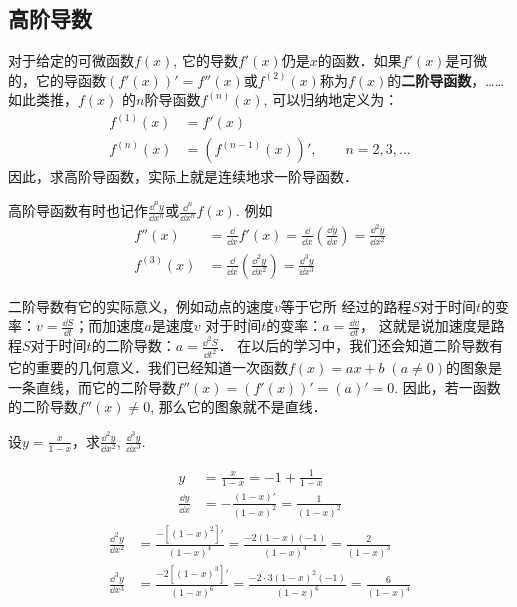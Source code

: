 \subsection{高阶导数}
对于给定的可微函数$f(x)$, 它的导数$f'(x)$仍是$x$的函数．如果$f'(x)$是可微的，它的导函数$(f'(x))'=f''(x)$或$f^{(2)}(x)$称为$f(x)$的\textbf{二阶导函数}，……如此类推，$f(x)$
的$n$阶导函数$f^{(n)}(x)$, 可以归纳地定义为：
\begin{align*}
  f ^{(1)} (x)&=f'(x)\\
  f ^{(n)} (x)&=\left(f^{(n-1)}(x)\right)',\qquad n=2,3,\ldots  
\end{align*}
因此，求高阶导函数，实际上就是连续地求一阶导函数．

高阶导函数有时也记作$\frac{\dd^n y}{\dd x^n}$或$\frac{\dd^n }{\dd x^n}f(x)$. 例如
\begin{align*}
    f''(x)&=\frac{\dd}{\dd x}f'(x)=\frac{\dd}{\dd x}\left(\frac{\dd y}{\dd x}\right)=\frac{\dd^2 y}{\dd x^2}\\
    f^{(3)}(x)&=\frac{\dd}{\dd x}\left(\frac{\dd^2 y}{\dd x^2}\right)=\frac{\dd^3 y}{\dd x^3}
\end{align*}

二阶导数有它的实际意义，例如动点的速度$v$等于它所
经过的路程$S$对于时间$t$的变率：$v=\frac{\dd S}{\dd t}$；而加速度$a$是速度$v$
对于时间$t$的变率：$a=\frac{\dd v}{\dd t}$，
这就是说加速度是路程$S$对于时间$t$的二阶导数：$a=\frac{\dd^2 S}{\dd t^2}$．
在以后的学习中，我们还会知道二阶导数有它的重要的几何意义．我们已经知道一次函数$f(x)=ax+b\; (a\ne 0)$的图象是一条直线，而它的二阶导数$f''(x)=(f'(x))'=(a)'=0$. 因此，若一函数的二阶导数$f''(x)\ne 0$, 那么它的图象就不是直线．

\begin{example}
设$y=\frac{x}{1-x}$，求$\frac{\dd^2 y}{\dd x^2}$, $\frac{\dd^3 y}{\dd x^3}$.
\end{example}

\begin{solution}
\begin{align*}
    y&=\frac{x}{1-x}=-1+\frac{1}{1-x}\\
\frac{\dd y}{\dd x}&=-\frac{(1-x)'}{(1-x)^2}=\frac{1}{(1-x)^2}
\end{align*}
\begin{align*}
    \frac{\dd^2 y}{\dd x^2}&=\frac{-[(1-x)^2]'}{(1-x)^4}=\frac{-2(1-x)(-1)}{(1-x)^4}=\frac{2}{(1-x)^3}\\
    \frac{\dd^3 y}{\dd x^3}&=\frac{-2[(1-x)^3]'}{(1-x)^6}=\frac{-2\cdot 3(1-x)^2(-1)}{(1-x)^6}=\frac{6}{(1-x)^4}  
\end{align*}
\end{solution}


